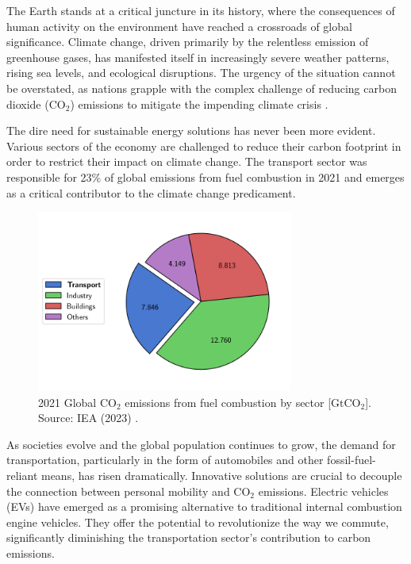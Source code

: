 The Earth stands at a critical juncture in its history, where the consequences of human activity on the environment have reached a crossroads of global significance. Climate change, driven primarily by the relentless emission of greenhouse gases, has manifested itself in increasingly severe weather patterns, rising sea levels, and ecological disruptions. The urgency of the situation cannot be overstated, as nations grapple with the complex challenge of reducing carbon dioxide (CO$_2$) emissions to mitigate the impending climate crisis \cite{solomon2009irreversible,noaa-co2,world2016ambient}. 

The dire need for sustainable energy solutions has never been more evident. Various sectors of the economy are challenged to reduce their carbon footprint in order to restrict their impact on climate change. The transport sector was responsible for 23\% of global emissions from fuel combustion in 2021 \cite{iea-transport} and emerges as a critical contributor to the climate change predicament. 

\begin{figure}[h]
    \centering
    \includegraphics[width=0.75\textwidth]{Images/Chapter1/iea-transport.png}
    \caption{2021 Global CO$_2$ emissions from fuel combustion by sector [$\text{GtCO}_2$]. Source: IEA (2023) \cite{iea-transport}.}
    \label{fig:iea-transport}
\end{figure}

As societies evolve and the global population continues to grow, the demand for transportation, particularly in the form of automobiles and other fossil-fuel-reliant means, has risen dramatically. Innovative solutions are crucial to decouple the connection between personal mobility and CO$_2$ emissions. Electric vehicles (EVs) have emerged as a promising alternative to traditional internal combustion engine vehicles. They offer the potential to revolutionize the way we commute, significantly diminishing the transportation sector's contribution to carbon emissions. 

